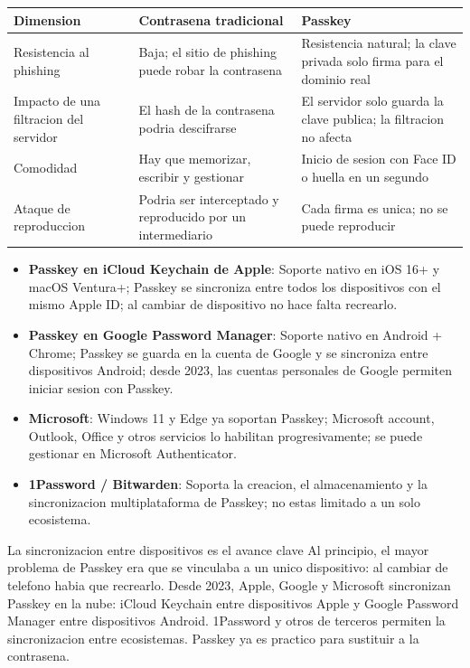 \begin{center}
\begin{tabularx}{\linewidth}{|X|X|X|}
\hline
\textbf{Dimension} & \textbf{Contrasena tradicional} & \textbf{Passkey} \tabularnewline
\hline
Resistencia al phishing & Baja; el sitio de phishing puede robar la contrasena & Resistencia natural; la clave privada solo firma para el dominio real \tabularnewline
Impacto de una filtracion del servidor & El hash de la contrasena podria descifrarse & El servidor solo guarda la clave publica; la filtracion no afecta \tabularnewline
Comodidad & Hay que memorizar, escribir y gestionar & Inicio de sesion con Face ID o huella en un segundo \tabularnewline
Ataque de reproduccion & Podria ser interceptado y reproducido por un intermediario & Cada firma es unica; no se puede reproducir \tabularnewline
\hline
\end{tabularx}
\end{center}


\begin{itemize}
  \item \textbf{Passkey en iCloud Keychain de Apple}: Soporte nativo en iOS 16+ y macOS Ventura+; Passkey se sincroniza entre todos los dispositivos con el mismo Apple ID; al cambiar de dispositivo no hace falta recrearlo.
  \item \textbf{Passkey en Google Password Manager}: Soporte nativo en Android + Chrome; Passkey se guarda en la cuenta de Google y se sincroniza entre dispositivos Android; desde 2023, las cuentas personales de Google permiten iniciar sesion con Passkey.
  \item \textbf{Microsoft}: Windows 11 y Edge ya soportan Passkey; Microsoft account, Outlook, Office y otros servicios lo habilitan progresivamente; se puede gestionar en Microsoft Authenticator.
  \item \textbf{1Password / Bitwarden}: Soporta la creacion, el almacenamiento y la sincronizacion multiplataforma de Passkey; no estas limitado a un solo ecosistema.
\end{itemize}

\begin{tcbinfo}{La sincronizacion entre dispositivos es el avance clave}
Al principio, el mayor problema de Passkey era que se vinculaba a un unico dispositivo: al cambiar de telefono habia que recrearlo. Desde 2023, Apple, Google y Microsoft sincronizan Passkey en la nube: iCloud Keychain entre dispositivos Apple y Google Password Manager entre dispositivos Android. 1Password y otros de terceros permiten la sincronizacion entre ecosistemas. Passkey ya es practico para sustituir a la contrasena.

\end{tcbinfo}

